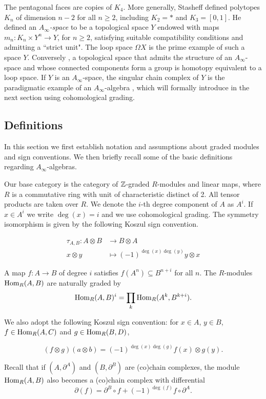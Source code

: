 \documentclass[Thesis.tex]{subfiles}
\begin{document}
The pentagonal faces are copies of $K_4$. More generally, Stasheff \cite{STASHEFFI} defined polytopes $K_n$ of dimension $n−2$ for all $n \geq 2$, including $K_2 = *$ and $K_3 = [0, 1]$. He defined an \emph{$A_\infty$-space} to be a topological space
$Y$ endowed with maps $m_n : K_n × Y^n \to Y$, for $n \geq 2$, satisfying suitable compatibility
conditions and admitting a ``strict unit". The loop space $\Omega X$ is the prime example of
such a space $Y$. Conversely \cite{Adams}, a topological space that admits the structure of
an $A_\infty$-space and whose connected components form a group is homotopy equivalent
to a loop space. If $Y$ is an $A_\infty$-space, the singular chain complex of $Y$ is the paradigmatic example
of an $A_\infty$-algebra \cite{STASHEFF}, which will formally introduce in the next section using cohomological grading.

\subsection{Definitions}

In this section we first establish notation and assumptions about graded modules and sign conventions. We then briefly recall some of the basic definitions regarding $A_\infty$-algebras.

Our base category is the category of $\mathbb{Z}$-graded $R$-modules and linear maps, where $R$ is a commutative ring with unit of characteristic distinct of 2. All tensor products are taken over $R$. We denote the $i$-th degree component of $A$ as $A^i$. If $x\in A^i$ we write $\deg(x)=i$ and we use cohomological grading. The symmetry isomorphism is given by the following Koszul sign convention.

\begin{align*}
\tau_{A,B}:A\otimes B&\to B\otimes A\\
x\otimes y &\mapsto (-1)^{\deg(x)\deg(y)}y\otimes x
\end{align*}

 A map $f:A\to B$ of degree $i$ satisfies $f(A^n)\subseteq B^{n+i}$ for all $n$. The $R$-modules $\operatorname{Hom}_R(A,B)$ are naturally graded by \[\operatorname{Hom}_R(A,B)^i=\prod_k\operatorname{Hom}_R(A^k,B^{k+i}).\]

We also adopt the following Koszul sign convention: for $x\in A$, $y\in B$, $f\in\operatorname{Hom}_R(A,C)$ and $g\in\operatorname{Hom}_R(B,D)$,

\[(f\otimes g)(a\otimes b)=(-1)^{\deg(x)\deg(g)}f(x)\otimes g(y).\]

Recall that if $(A,\partial^A)$ and $(B,\partial^B)$ are (co)chain complexes, the module $\operatorname{Hom}_R(A,B)$ also becomes a (co)chain complex with differential
\[\partial(f) = \partial^B\circ f +(-1)^{\deg(f)}f\circ\partial^A.\]
\end{document}
